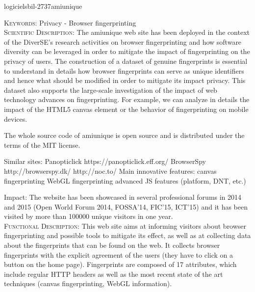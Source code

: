 \documentclass{ra2018}
\begin{document}

 \begin{module}{logiciels}{bil-2737}{amiunique}

   \textsc{Keywords:} Privacy - Browser fingerprinting \\ 


    \textsc{Scientific Description:} The amiunique web site has been deployed in the context of the DiverSE's research activities on browser fingerprinting and how software diversity can be leveraged in order to mitigate the impact of fingerprinting on the privacy of users. The construction of a dataset of genuine fingerprints is essential to understand in details how browser fingerprints can serve as unique identifiers and hence what should be modified in order to mitigate its impact privacy. This dataset also supports the large-scale investigation of the impact of web technology advances on fingerprinting. For example, we can analyze in details the impact of the HTML5 canvas element or the behavior of fingerprinting on mobile devices.

The whole source code of amiunique is open source and is distributed under the terms of the MIT license.

Similar sites:
    Panopticlick https://panopticlick.eff.org/
    BrowserSpy http://browserspy.dk/
    http://noc.to/
Main innovative features:
    canvas fingerprinting
    WebGL fingerprinting
    advanced JS features (platform, DNT, etc.)

Impact:
The website has been showcased in several professional forums in 2014 and 2015 (Open World Forum 2014, FOSSA'14, FIC'15, ICT'15) and it has been visited by more than 100000 unique visitors in one year.\\

 \textsc{Functional Description:}  This web site aims at informing visitors about browser fingerprinting and possible tools to mitigate its effect, as well as at collecting data about the fingerprints that can be found on the web. It collects browser fingerprints with the explicit agreement of the users (they have to click on a button on the home page). Fingerprints are composed of 17 attributes, which include regular HTTP headers as well as the most recent state of the art techniques (canvas fingerprinting, WebGL information).\\


\end{module}
\end{document}
